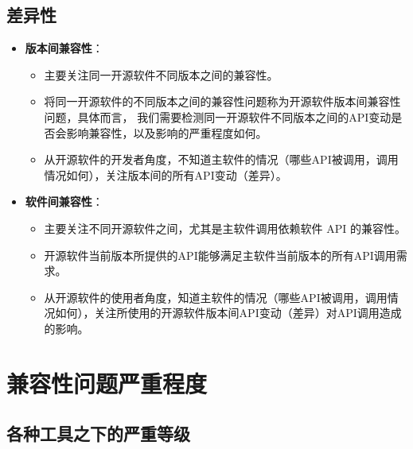 \documentclass[14pt,a4paper,UTF8,twoside]{article}
\begin{document}
\subsection{差异性}

\begin{itemize}
    \item \textbf{版本间兼容性}：
    \begin{itemize}
        \item 主要关注同一开源软件不同版本之间的兼容性。
        \item 将同一开源软件的不同版本之间的兼容性问题称为开源软件版本间兼容性问题，具体而言，
        我们需要检测同一开源软件不同版本之间的API变动是否会影响兼容性，以及影响的严重程度如何。
        \item 从开源软件的开发者角度，不知道主软件的情况（哪些API被调用，调用情况如何），关注版本间的所有API变动（差异）。
    \end{itemize}
    \item \textbf{软件间兼容性}：
    \begin{itemize}
        \item 主要关注不同开源软件之间，尤其是主软件调用依赖软件 API 的兼容性。
        \item 开源软件当前版本所提供的API能够满足主软件当前版本的所有API调用需求。
        \item 从开源软件的使用者角度，知道主软件的情况（哪些API被调用，调用情况如何），关注所使用的开源软件版本间API变动（差异）对API调用造成的影响。
    \end{itemize}
\end{itemize}

\section{兼容性问题严重程度}

\subsection{各种工具之下的严重等级}
\end{document}
